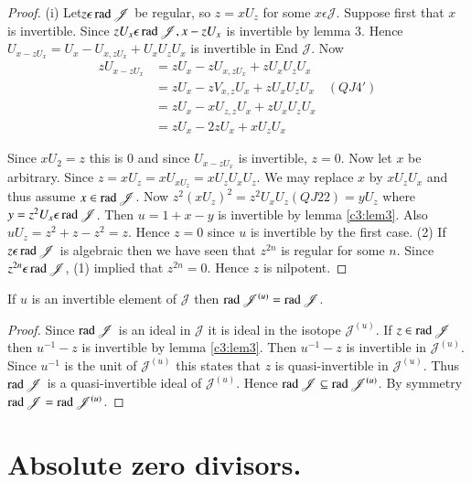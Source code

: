 \begin{proof}
(i) Let\pageoriginale $z\epsilon \operatorname{rad} \mathscr{J}$ be regular, so
  $z=xU_z$ for some $x\epsilon \mathscr{J}$. Suppose first that $x$ is
  invertible. Since $zU_x\epsilon \operatorname{rad} \mathscr{J}, x-z U_x$ is
  invertible by lemma $3$. Hence
  $U_{x-zU_{x}}=U_x-U_{x,zU_{x}}+U_xU_zU_x$ is invertible in End
  $\mathscr{J}$. Now
\begin{align*}
zU_{x-zU_{x}}&=zU_x-zU_{x,zU_{x}}+zU_xU_zU_x\\
&=zU_x-zV_{x,z}U_x+zU_xU_zU_x\quad (QJ 4')\\
&=zU_x-xU_{z,z}U_x+zU_xU_zU_x\\
&=zU_x-2zU_x+xU_zU_x
\end{align*}

Since $xU_2=z$ this is $0$ and since $U_{x-zU_{x}}$ is invertible,
$z=0$. Now let $x$ be arbitrary. Since
$z=xU_z=xU_{xU_{z}}=xU_zU_xU_z$. We may replace $x$ by $xU_zU_x$ and
thus assume $x \in \operatorname{rad} \mathscr{J}$. Now $z^{2}(xU_z)^{2}=z^{2}U_xU_z(QJ
22)=yU_z$ where $y=z^{2}U_x\epsilon \operatorname{rad} \mathscr{J}$. Then $u=1+x-y$
is invertible by lemma \ref{c3:lem3}. Also $u U_z=z^{2}+z-z^{2}=z$. Hence $z=0$
since $u$ is invertible by the first case. (2) If $z\epsilon \operatorname{rad}
\mathscr{J}$ is algebraic then we have seen that $z^{2n}$ is regular
for some $n$. Since $z^{2n}\epsilon \operatorname{rad} \mathscr{J}$, (1) implied that
$z^{2n}=0$. Hence $z$ is nilpotent.
\end{proof}

\begin{thm}\label{c3:thm4}
  If $u$ is an invertible element of $\mathscr{J}$ then $\operatorname{rad}
  \mathscr{J}^{(u)}=\operatorname{rad}\mathscr{J}$. 
\end{thm}

\begin{proof}
Since $\operatorname{rad} \mathscr{J}$ is an ideal in $\mathscr{J}$ it is ideal in
the isotope $\mathscr{J}^{(u)}$. If $z\in  \operatorname{rad} \mathscr{J}$ then
$u^{-1}-z$ is invertible by lemma \ref{c3:lem3}. Then $u^{-1}-z$ is invertible
in $\mathscr{J}^{(u)}$. Since $u^{-1}$ is the unit of
$\mathscr{J}^{(u)}$ this states that $z$ is quasi-invertible in
$\mathscr{J}^{(u)}$. Thus $\operatorname{rad} \mathscr{J}$ is a quasi-invertible ideal of
$\mathscr{J}^{(u)}$. Hence $\operatorname{rad} \mathscr{J}\subseteq \operatorname{rad}
\mathscr{J}^{(u)}$. By symmetry $\operatorname{rad} \mathscr{J}=\operatorname{rad}
\mathscr{J}^{(u)}$.\pageoriginale 
\end{proof}

\section{Absolute zero divisors.}\label{c3:sec3}

